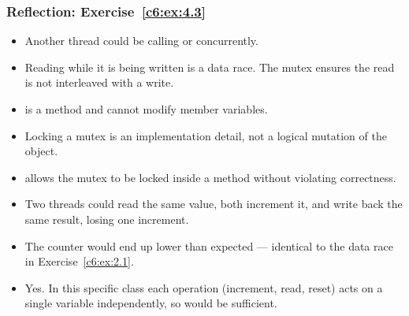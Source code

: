 
\subsubsection{Reflection: Exercise~\ref{c6:ex:4.3}}
\begin{itemize}
  \item Another thread could be calling  or  concurrently.
  \item Reading  while it is being written is a data race. The mutex ensures the read
    is not interleaved with a write.
\end{itemize}

\begin{itemize}
  \item {} is a  method and cannot modify member variables.
  \item Locking a mutex is an implementation detail, not a logical mutation of the object.
  \item {} allows the mutex to be locked inside a  method without violating
     correctness.
\end{itemize}

\begin{itemize}
  \item Two threads could read the same value, both increment it, and write back the same result,
    losing one increment.
  \item The counter would end up lower than expected --- identical to the data race in
    Exercise~\ref{c6:ex:2.1}.
\end{itemize}

\begin{itemize}
  \item Yes. In this specific class each operation (increment, read, reset) acts on a single
    variable independently, so  would be sufficient.
\end{itemize}

